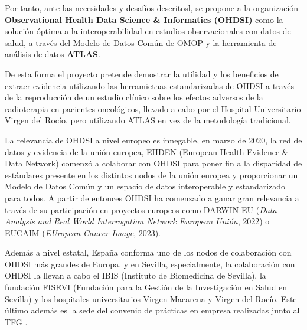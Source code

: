Por tanto, ante las necesidades y desafíos descritosl, se propone a la organización \textbf{Observational Health Data Science \& Informatics (OHDSI)} como la solución óptima a la interoperabilidad en estudios observacionales con datos de salud, a través del Modelo de Datos Común de OMOP y la herramienta de análisis de datos \textbf{ATLAS}. 

De esta forma el proyecto pretende demostrar la utilidad y los beneficios de extraer evidencia utilizando las herramietnas estandarizadas de OHDSI a través de la reproducción de un estudio clínico sobre los efectos adversos de la radioterapia en pacientes oncológicos, llevado a cabo por el Hospital Universitario Virgen del Rocío, pero utilizando ATLAS en vez de la metodología tradicional.

La relevancia de OHDSI a nivel europeo es innegable, en marzo de 2020, la red de datos y evidencia de la unión europea, EHDEN (European Health Evidence \& Data Network) comenzó a colaborar con OHDSI para poner fin a la disparidad de estándares presente en los distintos nodos de la unión europea y proporcionar un Modelo de Datos Común y un espacio de datos interoperable y estandarizado para todos. A partir de entonces OHDSI ha comenzado a ganar gran relevancia a través de su participación en proyectos europeos como DARWIN EU (\textit{Data Analysis and Real World Interrogation Network European Unión}, 2022) \cite{OHDSI2023Darwin} %
o EUCAIM (\textit{EUropean Cancer Image}, 2023).%

Además a nivel estatal, España conforma uno de los nodos de colaboración con OHDSI más grandes de Europa. %
y en Sevilla, especialmente, la colaboración con OHDSI la llevan a cabo el IBIS (Instituto de Biomedicina de Sevilla), la fundación FISEVI (Fundación para la Gestión de la Investigación en Salud en Sevilla) y los hospitales universitarios Virgen Macarena y Virgen del Rocío. Este último además es la sede del convenio de prácticas en empresa realizadas junto al TFG . %



